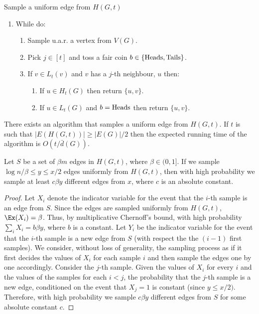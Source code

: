 \textsf{Sample a uniform edge from $H(G, t)$}
\begin{enumerate}
\item While do:
\begin{enumerate}
\item Sample u.a.r. a vertex from $V(G)$.
\item Pick $j\in [t]$ and toss a fair coin $b\in \{\rm{Heads}, \rm{Tails}\}$.
\item If $v\in L_t(v)$ and $v$ has a $j$-th neighbour, $u$ then:
\begin{enumerate}
\item If $u \in H_t(G)$ then return $\{u,v\}$. 
\item If $u \in L_t(G)$ and $b=\rm{Heads}$ then return $\{u,v\}$.
\end{enumerate}
\end{enumerate}
\end{enumerate}


\begin{claim}\label{clm:sample}
There exists an algorithm that samples a uniform edge from $H(G, t)$.
If $t$ is such that $|E(H(G, t))| \geq |E(G)|/2$ then the expected running time of the algorithm is $O(t/\bar{d}(G))$. 
\end{claim}



\begin{claim}\label{clm:sampleedges}
Let $S$ be a set of $\beta m$ edges in $H(G, t)$, where $\beta \in (0, 1]$. If we sample $\log n/\beta  \leq y \leq x/2$ edges uniformly from $H(G, t)$, then with high probability we sample at least $c \beta y$ different edges from $x$, where $c$ is an absolute constant. 
\end{claim}

\begin{proof}
    Let $X_i$ denote the indicator variable for the event that the $i$-th sample is an edge from $S$. Since the edges are sampled uniformly from $H(G, t)$, $\Ex(X_i) = \beta$.
    Thus, by multiplicative Chernoff's bound, with high probability $\sum_i X_i = b \beta y$, where $b$ is a constant. 
    Let $Y_i$ be the indicator variable for the event that the $i$-th sample is a new edge from $S$ (with respect the the $(i-1)$ first samples).
    We consider, without loss of generality, the sampling process as if it first decides the values of $X_i$ for each sample $i$ and then sample the edges one by one accordingly.
    Consider the $j$-th sample.
    Given the values of $X_i$ for every $i$ and the values of the samples for each $i < j$, the probability that the $j$-th sample is a new edge, conditioned on the event that $X_j = 1$ is constant (since $y \leq x/2)$. Therefore, with high probability we sample $c \beta y$ different edges from $S$ for some absolute constant $c$. 
\end{proof}

